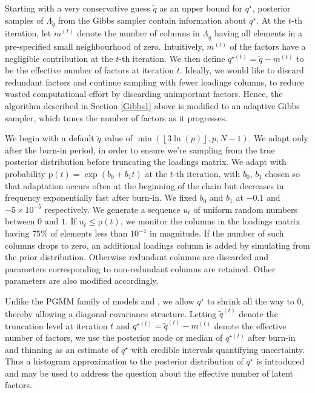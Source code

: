 \documentclass[a4paper,12pt,fleqn]{article}
\numberwithin{equation}{section}
\begin{document}
Starting with a very conservative guess $\tilde{q}$ as an upper bound for $q^\star$, posterior samples of $\Lambda_{\tilde{q}}$ from the Gibbs sampler contain information about $q^\star$. At the $t$-th iteration, let $m^{\left(t\right)}$ denote the number of columns in $\Lambda_{\tilde{q}}$ having all elements in a pre-specified small neighbourhood of zero. Intuitively, $m^{\left(t\right)}$ of the factors have a negligible contribution at the $t$-th iteration. We then define $q^{\star\left(t\right)} = \tilde{q} - m^{\left(t\right)}$ to be the effective number of factors at iteration $t$. Ideally, we would like to discard redundant factors and continue sampling with fewer loadings columns, to reduce wasted computational effort by discarding unimportant factors. Hence, the algorithm described in Section \ref{Gibbs1} above is modified to an adaptive Gibbs sampler, which tunes the number of factors as it progresses. 

We begin with a default $\tilde{q}$ value of $\min\left(\left\lfloor 3\ln(p)\right\rfloor, p, N-1\right)$. We adapt only after the burn-in period, in order to ensure we're sampling from the true posterior distribution before truncating the loadings matrix. We adapt with probability $\mathrm{p}\left(t\right) = \exp\left(b_0 + b_1t\right)$ at the $t$-th iteration, with $b_0$, $b_1$ chosen so that adaptation occurs often at the beginning of the chain but decreases in frequency exponentially fast after burn-in. We fixed $b_0$ and $b_1$ at $-0.1$ and $-5 \times 10^{-5}$ respectively. We generate a sequence $u_t$ of uniform random numbers between $0$ and $1$. If $u_t \leq \mathrm{p}\left(t\right)$, we monitor the columns in the loadings matrix having $75\%$ of elements less than $10^{-1}$ in magnitude. If the number of such columns drops to zero, an additional loadings column is added by simulating from the prior distribution. Otherwise redundant columns are discarded and parameters corresponding to non-redundant columns are retained. Other parameters are also modified accordingly.

Unlike the PGMM family of models and \citet{Bhattacharya2011}, we allow $q^{\star}$ to shrink all the way to 0, thereby allowing a diagonal covariance structure. Letting $\tilde{q}^{\left(t\right)}$ denote the truncation level at iteration $t$ and $q^{\star\left(t\right)} = \tilde{q}^{\left(t\right)} - m^{\left(t\right)}$ denote the effective number of factors, we use the posterior mode or median of $q^{\star\left(t\right)}$ after burn-in and thinning as an estimate of $q^\star$ with credible intervals quantifying uncertainty. Thus a histogram approximation to the posterior distribution of $q^\star$ is introduced and may be used to address the question about the effective number of latent factors.
\end{document}
